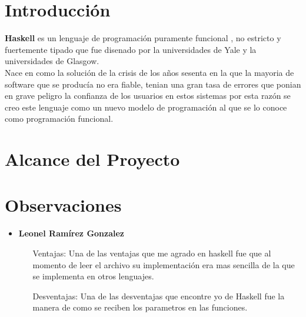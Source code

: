 \documentclass[a4paper,openright,12pt]{report}
\begin{document}
\chapter{Introducción}
\textbf{Haskell} es un lenguaje de programación puramente funcional , no estricto y fuertemente tipado que fue disenado por la universidades de Yale y la universidades de Glasgow.\\

Nace en como la solución de la crisis de los años sesenta en la que la mayoria de software que se producía no era fiable, tenian una gran tasa de errores que ponian en grave peligro la confianza de los usuarios en estos sistemas por esta razón se creo este lenguaje como un nuevo modelo de programación al que se lo conoce como programación funcional.\\


\chapter{Alcance del Proyecto}


\chapter{Observaciones}
\begin{itemize}
\item \textbf{Leonel Ramírez Gonzalez}
\begin{itemize}
	\item[Ventajas: ]Una de las ventajas que me agrado en haskell fue que al momento de leer el archivo su implementación era mas sencilla de la que se implementa en otros lenguajes.
	\item[Desventajas: ]Una de las desventajas que encontre yo de Haskell fue la manera de como se reciben los parametros en las funciones.
\end{itemize}
\end{itemize}
\end{document}
